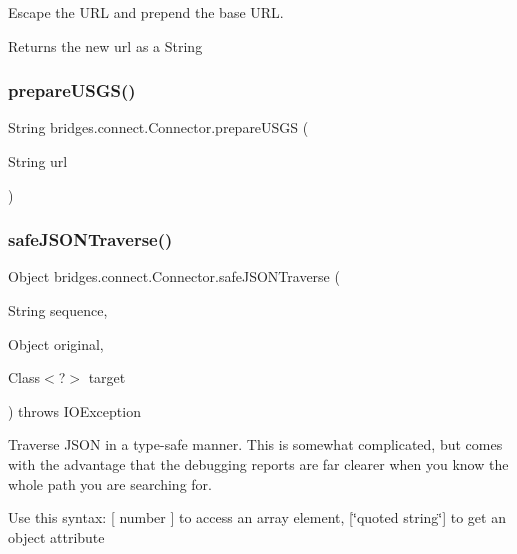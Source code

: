 Escape the U\+RL and prepend the base U\+RL. \begin{DoxyReturn}{Returns}
the new url as a String 
\end{DoxyReturn}
\mbox{\label{classbridges_1_1connect_1_1_connector_aa0201e2569358ff906d3c14d654711e5}} 
\subsubsection{\texorpdfstring{prepare\+U\+S\+G\+S()}{prepareUSGS()}}
{\footnotesize\ttfamily String bridges.\+connect.\+Connector.\+prepare\+U\+S\+GS (\begin{DoxyParamCaption}\item[{String}]{url }\end{DoxyParamCaption})}

\mbox{\label{classbridges_1_1connect_1_1_connector_ab7d1d242fbf9acade316650e54a3d020}} 
\subsubsection{\texorpdfstring{safe\+J\+S\+O\+N\+Traverse()}{safeJSONTraverse()}}
{\footnotesize\ttfamily Object bridges.\+connect.\+Connector.\+safe\+J\+S\+O\+N\+Traverse (\begin{DoxyParamCaption}\item[{String}]{sequence,  }\item[{Object}]{original,  }\item[{Class$<$?$>$}]{target }\end{DoxyParamCaption}) throws I\+O\+Exception}

Traverse J\+S\+ON in a type-\/safe manner. This is somewhat complicated, but comes with the advantage that the debugging reports are far clearer when you know the whole path you are searching for.

Use this syntax\+: \mbox{[} number \mbox{]} to access an array element, \mbox{[}\char`\"{}quoted string\char`\"{}\mbox{]} to get an object attribute


